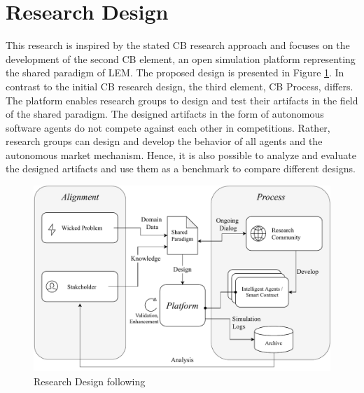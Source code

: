 \section{Research Design}
\label{sec:research_design}

This research is inspired by the stated CB research approach and focuses on the development of 
the second CB element, an open simulation platform representing the shared paradigm of LEM. 
The proposed design is presented in Figure \ref{figure:competitive_benchmarking}. 
In contrast to the initial CB research design, the third element, CB Process, differs. 
The platform enables research groups to design and test their artifacts in the field of the shared 
paradigm. The designed artifacts in the form of autonomous 
software agents do not compete against each other in competitions. 
Rather, research groups can design and develop the behavior of all agents and the 
autonomous market mechanism. Hence, it is also possible to analyze and evaluate the designed 
artifacts and use them as a benchmark to compare different designs. 

\begin{figure}[htbp]
	\centering
	\includegraphics[width=1\linewidth]{./figures/competitive_benchmarking.pdf}
	\caption{Research Design following \protect{}}
	\label{figure:competitive_benchmarking}
\end{figure}

